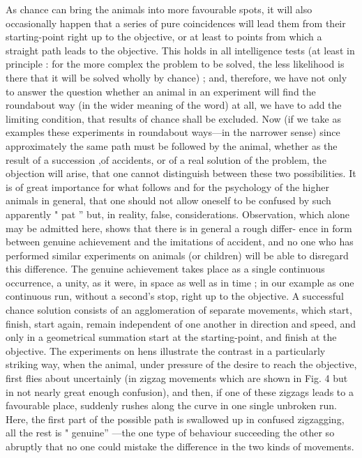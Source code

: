 \documentclass{article}
\begin{document}
As chance can bring the animals into more favourable
spots, it will also occasionally happen that a series of pure
coincidences will lead them from their starting-point right
up to the objective, or at least to points from which a straight
path leads to the objective. This holds in all intelligence
tests (at least in principle : for the more complex the problem
to be solved, the less likelihood is there that it will be solved
wholly by chance) ; and, therefore, we have not only to answer
the question whether an animal in an experiment will find
the roundabout way (in the wider meaning of the word) at
all, we have to add the limiting condition, that results of
chance shall be excluded. Now (if we take as examples these
experiments in roundabout ways—in the narrower sense) since
approximately the same path must be followed by the animal,
whether as the result of a succession ,of accidents, or of a
real solution of the problem, the objection will arise, that one
cannot distinguish between these two possibilities. It is
of great importance for what follows and for the psychology
of the higher animals in general, that one should not allow
oneself to be confused by such apparently " pat ” but, in
reality, false, considerations. Observation, which alone may
be admitted here, shows that there is in general a rough differ-
ence in form between genuine achievement and the imitations
of accident, and no one who has performed similar experiments
on animals (or children) will be able to disregard this difference.
The genuine achievement takes place as a single continuous
occurrence, a unity, as it were, in space as well as in time ;
in our example as one continuous run, without a second’s
stop, right up to the objective. A successful chance solution
consists of an agglomeration of separate movements, which
start, finish, start again, remain independent of one another
in direction and speed, and only in a geometrical summation
start at the starting-point, and finish at the objective. The
experiments on hens illustrate the contrast in a particularly
striking way, when the animal, under pressure of the desire
to reach the objective, first flies about uncertainly (in zigzag
movements which are shown in Fig. 4 but in not nearly
great enough confusion), and then, if one of these zigzags
leads to a favourable place, suddenly rushes along the curve
in one single unbroken run. Here, the first part of the
possible path is swallowed up in confused zigzagging, all the
rest is " genuine” —the one type of behaviour succeeding
the other so abruptly that no one could mistake the difference
in the two kinds of movements.
\end{document}
